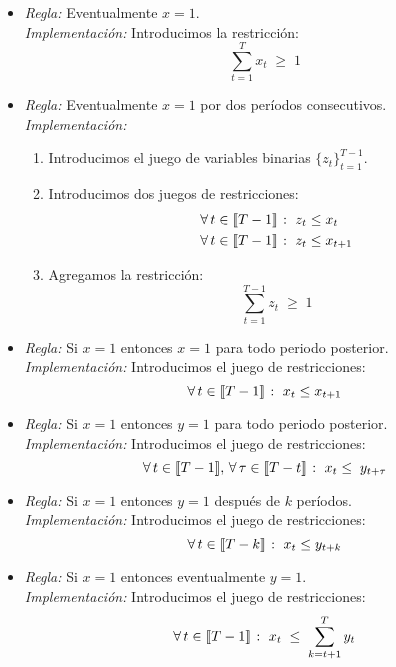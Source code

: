 \documentclass[ 10pt, xcolor = dvipsnames]{beamer}
\begin{document}
\begin{frame}[allowframebreaks]
\frametitle{\insertsection}

\begin{itemize}
\item \emph{Regla:} Eventualmente $x = 1$. \\[1ex]
\emph{Implementaci\'on:} Introducimos la restricci\'on: 
\[
\sum_{t=1}^T x_t \; \geq \; 1
\]

\item \emph{Regla:} Eventualmente $x = 1$ por dos per\'iodos consecutivos. \\[1ex]
\emph{Implementaci\'on:}
\begin{enumerate}
\item Introducimos el juego de variables binarias $\{ z_t \}_{t=1}^{T-1}$. 
\item Introducimos dos juegos de restricciones: 
\begin{align*}
& \forall \, t \in \llbracket T-1 \rrbracket \; \colon \; z_t \leq x_{t} \\
& \forall \, t \in \llbracket T-1 \rrbracket \; \colon \; z_t \leq x_{t+1}
\end{align*}
\item Agregamos la restricci\'on: 
\[
\sum_{t=1}^{T-1} z_t \; \geq \; 1
\]
\end{enumerate}

\item \emph{Regla:} Si $x = 1$ entonces $x = 1$ para todo periodo posterior. \\[1ex]
\emph{Implementaci\'on:} Introducimos el juego de restricciones: 
\[
\forall \, t \in \llbracket T-1 \rrbracket \; \colon \; x_t \leq x_{t+1}
\]

\item \emph{Regla:} Si $x = 1$ entonces $y = 1$ para todo periodo posterior. \\[1ex]
\emph{Implementaci\'on:} Introducimos el juego de restricciones: 
\[
\forall \, t \in \llbracket T-1 \rrbracket, \,
\forall \, \tau \in \llbracket T-t \rrbracket \; \colon \;
x_t \leq \; y_{t + \tau}
\]
\framebreak

\item \emph{Regla:} Si $x = 1$ entonces $y = 1$ despu\'es de $k$ per\'iodos. \\[1ex]
\emph{Implementaci\'on:} Introducimos el juego de restricciones: 
\[
\forall \, t \in \llbracket T-k \rrbracket \; \colon \; x_t \leq y_{t+k}
\]

\item \emph{Regla:} Si $x = 1$ entonces eventualmente $y = 1$. \\[1ex]
\emph{Implementaci\'on:} Introducimos el juego de restricciones: 
\[
\forall \, t \in \llbracket T-1 \rrbracket \; \colon \; x_t \; \leq \;
\sum_{k = t+1}^T y_t
\]

\end{itemize}

\end{frame}
\end{document}
